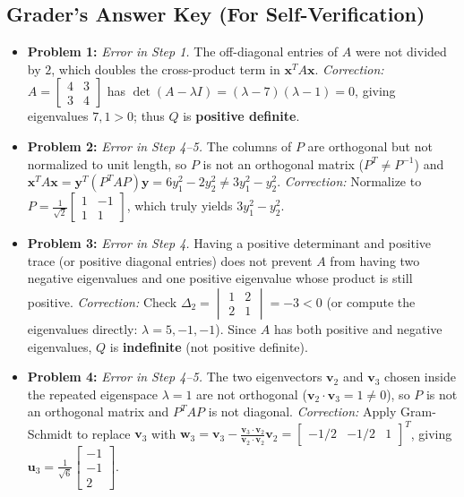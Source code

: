 \documentclass[11pt, letterpaper]{article}
\theoremstyle{definition}
\theoremstyle{remark}
\begin{document}
\subsection*{Grader's Answer Key (For Self-Verification)}
\begin{itemize}
    \item \textbf{Problem 1:} \emph{Error in Step 1.} The off-diagonal entries of $A$ were not divided by $2$, which doubles the cross-product term in $\mathbf{x}^T A \mathbf{x}$. \emph{Correction:} $A = \begin{bmatrix} 4 & 3 \\ 3 & 4 \end{bmatrix}$ has $\det(A - \lambda I) = (\lambda - 7)(\lambda - 1) = 0$, giving eigenvalues $7, 1 > 0$; thus $Q$ is \textbf{positive definite}.
    \item \textbf{Problem 2:} \emph{Error in Step 4--5.} The columns of $P$ are orthogonal but not normalized to unit length, so $P$ is not an orthogonal matrix ($P^T \ne P^{-1}$) and $\mathbf{x}^T A \mathbf{x} = \mathbf{y}^T (P^T A P) \mathbf{y} = 6y_1^2 - 2y_2^2 \ne 3y_1^2 - y_2^2$. \emph{Correction:} Normalize to $P = \frac{1}{\sqrt{2}}\begin{bmatrix} 1 & -1 \\ 1 & 1 \end{bmatrix}$, which truly yields $3y_1^2 - y_2^2$.
    \item \textbf{Problem 3:} \emph{Error in Step 4.} Having a positive determinant and positive trace (or positive diagonal entries) does not prevent $A$ from having two negative eigenvalues and one positive eigenvalue whose product is still positive. \emph{Correction:} Check $\Delta_2 = \begin{vmatrix} 1 & 2 \\ 2 & 1 \end{vmatrix} = -3 < 0$ (or compute the eigenvalues directly: $\lambda = 5, -1, -1$). Since $A$ has both positive and negative eigenvalues, $Q$ is \textbf{indefinite} (not positive definite).
    \item \textbf{Problem 4:} \emph{Error in Step 4--5.} The two eigenvectors $\mathbf{v}_2$ and $\mathbf{v}_3$ chosen inside the repeated eigenspace $\lambda = 1$ are not orthogonal ($\mathbf{v}_2 \cdot \mathbf{v}_3 = 1 \ne 0$), so $P$ is not an orthogonal matrix and $P^T A P$ is not diagonal. \emph{Correction:} Apply Gram-Schmidt to replace $\mathbf{v}_3$ with $\mathbf{w}_3 = \mathbf{v}_3 - \frac{\mathbf{v}_3 \cdot \mathbf{v}_2}{\mathbf{v}_2 \cdot \mathbf{v}_2}\mathbf{v}_2 = \begin{bmatrix} -1/2 & -1/2 & 1 \end{bmatrix}^T$, giving $\mathbf{u}_3 = \frac{1}{\sqrt{6}}\begin{bmatrix} -1 \\ -1 \\ 2 \end{bmatrix}$.

\end{itemize}
\end{document}
